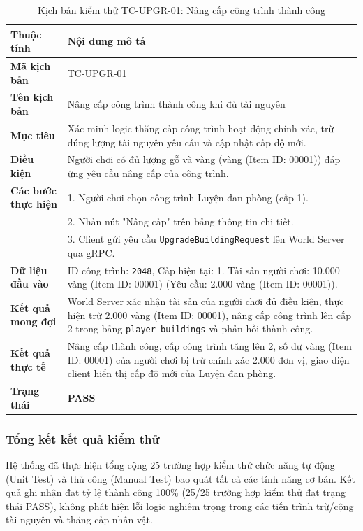 \documentclass[../Project.tex]{subfiles}
\begin{document}
\begin{table}[H]
\centering
\begin{tabular}{|l|p{10.5cm}|}
\hline
\textbf{Thuộc tính} & \textbf{Nội dung mô tả} \\ \hline
\textbf{Mã kịch bản} & TC-UPGR-01 \\ \hline
\textbf{Tên kịch bản} & Nâng cấp công trình thành công khi đủ tài nguyên \\ \hline
\textbf{Mục tiêu} & Xác minh logic thăng cấp công trình hoạt động chính xác, trừ đúng lượng tài nguyên yêu cầu và cập nhật cấp độ mới. \\ \hline
\textbf{Điều kiện} & Người chơi có đủ lượng gỗ và vàng (vàng (Item ID: 00001)) đáp ứng yêu cầu nâng cấp của công trình. \\ \hline
\textbf{Các bước thực hiện} & 
1. Người chơi chọn công trình Luyện đan phòng (cấp 1). \\
& 2. Nhấn nút "Nâng cấp" trên bảng thông tin chi tiết. \\
& 3. Client gửi yêu cầu \texttt{UpgradeBuildingRequest} lên World Server qua gRPC. \\ \hline
\textbf{Dữ liệu đầu vào} & ID công trình: \texttt{2048}, Cấp hiện tại: 1. Tài sản người chơi: 10.000 vàng (Item ID: 00001) (Yêu cầu: 2.000 vàng (Item ID: 00001)). \\ \hline
\textbf{Kết quả mong đợi} & World Server xác nhận tài sản của người chơi đủ điều kiện, thực hiện trừ 2.000 vàng (Item ID: 00001), nâng cấp công trình lên cấp 2 trong bảng \texttt{player\_buildings} và phản hồi thành công. \\ \hline
\textbf{Kết quả thực tế} & Nâng cấp thành công, cấp công trình tăng lên 2, số dư vàng (Item ID: 00001) của người chơi bị trừ chính xác 2.000 đơn vị, giao diện client hiển thị cấp độ mới của Luyện đan phòng. \\ \hline
\textbf{Trạng thái} & \textbf{PASS} \\ \hline
\end{tabular}
\caption{Kịch bản kiểm thử TC-UPGR-01: Nâng cấp công trình thành công}
\label{tab:tc_upgrade_01}
\end{table}

\subsubsection{Tổng kết kết quả kiểm thử}
Hệ thống đã thực hiện tổng cộng 25 trường hợp kiểm thử chức năng tự động (Unit Test) và thủ công (Manual Test) bao quát tất cả các tính năng cơ bản. Kết quả ghi nhận đạt tỷ lệ thành công 100\% (25/25 trường hợp kiểm thử đạt trạng thái PASS), không phát hiện lỗi logic nghiêm trọng trong các tiến trình trừ/cộng tài nguyên và thăng cấp nhân vật.
\end{document}
